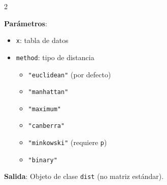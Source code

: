 \documentclass[10pt,a4paper]{article}
\begin{document}
\begin{multicols}{2}
\begin{tcolorbox}[title=dist(): Matriz de Distancias, equal height group=CL5]
        \textbf{Parámetros}:
        \begin{itemize}
            \item \texttt{x}: tabla de datos
            \item \texttt{method}: tipo de distancia
            \begin{itemize}
                \item \texttt{"euclidean"} (por defecto)
                \item \texttt{"manhattan"}
                \item \texttt{"maximum"}
                \item \texttt{"canberra"}
                \item \texttt{"minkowski"} (requiere \texttt{p})
                \item \texttt{"binary"}
            \end{itemize}
        \end{itemize}
        
        \textbf{Salida}: Objeto de clase \texttt{dist} (no matriz estándar).
    \end{tcolorbox}
\end{multicols}
\end{document}
